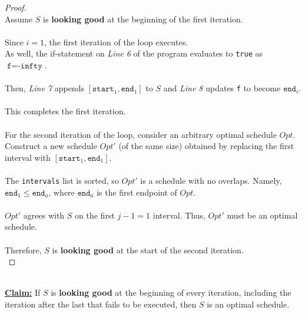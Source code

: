 \documentclass[12pt]{article}
\begin{document}
\begin{proof}
\leavevmode\\
    Assume \( S \) is \textbf{looking good} at the beginning of the first iteration. \\
    \\
    Since \( i = 1 \), the first iteration of the loop executes. \\
    As well, the if-statement on \textit{Line 6} of the program evaluates to \texttt{true} as \( \texttt{f} = \texttt{-infty} \). \\
    \\
    Then, \textit{Line 7} appends \( [\texttt{start}_1, \texttt{end}_1] \) to \( S \) and \textit{Line 8} updates \texttt{f} to become \( \texttt{end}_i \). \\
    \\
    This completes the first iteration. \\
    \\
    For the second iteration of the loop, consider an arbitrary optimal schedule \( Opt \). Construct a new schedule \( Opt' \) (of the same size) obtained by replacing the first interval with \( [\texttt{start}_1, \texttt{end}_1] \). \\
    \\
    The \texttt{intervals} list is sorted, so \( Opt' \) is a schedule with no overlaps. Namely, \( \texttt{end}_1 \leq \texttt{end}_a \), where \( \texttt{end}_a \) is the first endpoint of \( Opt \). \\
    \\
    \( Opt' \) agrees with \( S \) on the first \( j - 1 = 1 \) interval. Thus, \( Opt' \) must be an optimal schedule. \\
    \\
    Therefore, \( S \) is \textbf{looking good} at the start of the second iteration. \\
\end{proof}
\leavevmode\\
\underline{\textbf{Claim:}} If \( S \) is \textbf{looking good} at the beginning of every iteration, including the iteration after the last that fails to be executed, then \( S \) is an optimal schedule.
\end{document}
